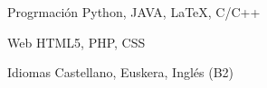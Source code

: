 


\begin{cvskills}


\cvskill
{Progrmación} %
{Python, JAVA, LaTeX, C/C++} %


\cvskill
{Web} %
{HTML5, PHP, CSS} %


\cvskill
{Idiomas} %
{Castellano, Euskera, Inglés (B2)} %


\end{cvskills}